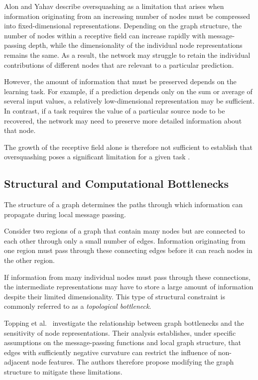 \documentclass[english]{lni}
\begin{document}
Alon and Yahav \cite{alon2021bottleneck} describe oversquashing as a limitation that arises when information originating from
an increasing number of nodes must be compressed into fixed-dimensional representations. Depending on the graph structure, the number of nodes within a receptive field can increase rapidly with message-passing depth, while the dimensionality of the individual node representations remains the same. As a result, the network may struggle to retain the individual contributions of different nodes that are relevant to a particular prediction.

However, the amount of information that must be preserved depends on the learning task. For example, if a prediction depends only on the sum or average of several input values, a relatively low-dimensional representation may be sufficient. In contrast, if a task requires the value of a particular source node to be recovered, the network may need to preserve more detailed information about that node.

The growth of the receptive field alone is therefore not sufficient to establish that oversquashing poses a significant limitation for a given task
\cite{kormann2026position}.

\subsection{Structural and Computational Bottlenecks}
\label{sec:oversquashing-bottlenecks}

The structure of a graph determines the paths through which information can propagate during local message passing.

Consider two regions of a graph that contain many nodes but are connected to each other through only a small number of
edges. Information originating from one region must pass through these connecting edges before it can reach nodes in the other region.

If information from many individual nodes must pass through these connections, the intermediate representations may have to store a large amount of information despite their limited dimensionality. This type of structural constraint is commonly referred to as a \emph{topological bottleneck}.

Topping et al.\ \cite{topping2022oversquashing} investigate the relationship between graph bottlenecks and the sensitivity of node representations. Their analysis establishes, under specific assumptions on the message-passing functions and local graph structure, that edges with sufficiently negative curvature can restrict the influence of non-adjacent node features. The authors therefore propose modifying the graph structure to mitigate these limitations.
\end{document}
